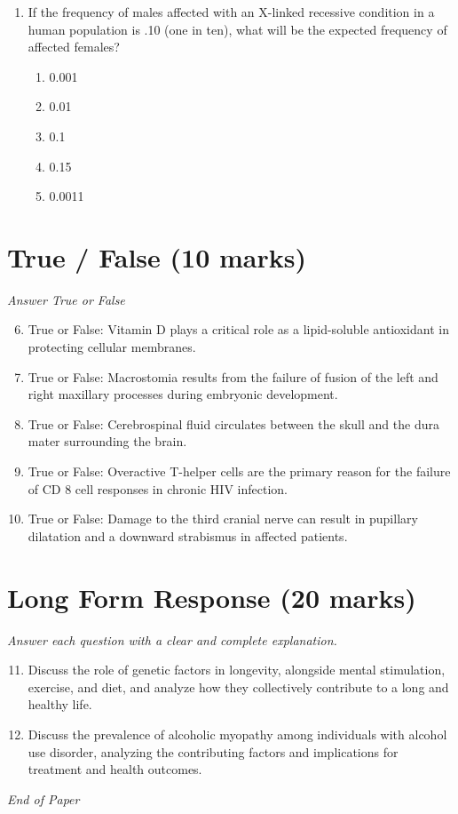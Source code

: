 \documentclass[12pt]{article}
\begin{document}
\begin{enumerate}[label=\arabic*.]
\begin{enumerate}[label=(\alph*)]
    \item Working part-time
    \item Mountain climbing
    \item Household chores
    \item Travel
\end{enumerate}
\item If the frequency of males affected with an X-linked recessive condition in a human population is .10 (one in ten), what will be the expected frequency of affected females?
\begin{enumerate}[label=(\alph*)]
    \item 0.001
    \item 0.01
    \item 0.1
    \item 0.15
    \item 0.0011
\end{enumerate}
\end{enumerate}

\section*{True / False (10 marks)}
\textit{Answer True or False}
\begin{enumerate}[label=\arabic*.]
\setcounter{enumi}{5}
\item True or False: Vitamin D plays a critical role as a lipid-soluble antioxidant in protecting cellular membranes.
\item True or False: Macrostomia results from the failure of fusion of the left and right maxillary processes during embryonic development.
\item True or False: Cerebrospinal fluid circulates between the skull and the dura mater surrounding the brain.
\item True or False: Overactive T-helper cells are the primary reason for the failure of CD 8 cell responses in chronic HIV infection.
\item True or False: Damage to the third cranial nerve can result in pupillary dilatation and a downward strabismus in affected patients.
\end{enumerate}

\section*{Long Form Response (20 marks)}
\textit{Answer each question with a clear and complete explanation.}
\begin{enumerate}[label=\arabic*.]
\setcounter{enumi}{10}
\item Discuss the role of genetic factors in longevity, alongside mental stimulation, exercise, and diet, and analyze how they collectively contribute to a long and healthy life.
\item Discuss the prevalence of alcoholic myopathy among individuals with alcohol use disorder, analyzing the contributing factors and implications for treatment and health outcomes.
\end{enumerate}

\vfill
\noindent\textit{End of Paper}
\end{document}

